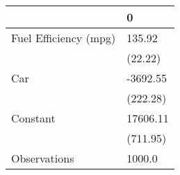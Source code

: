 \begin{tabular}{ll}
\toprule
{} &         0 \\
\midrule
Fuel Efficiency (mpg) &    135.92 \\
                      &   (22.22) \\
Car                   &  -3692.55 \\
                      &  (222.28) \\
Constant              &  17606.11 \\
                      &  (711.95) \\
Observations          &    1000.0 \\
\bottomrule
\end{tabular}
